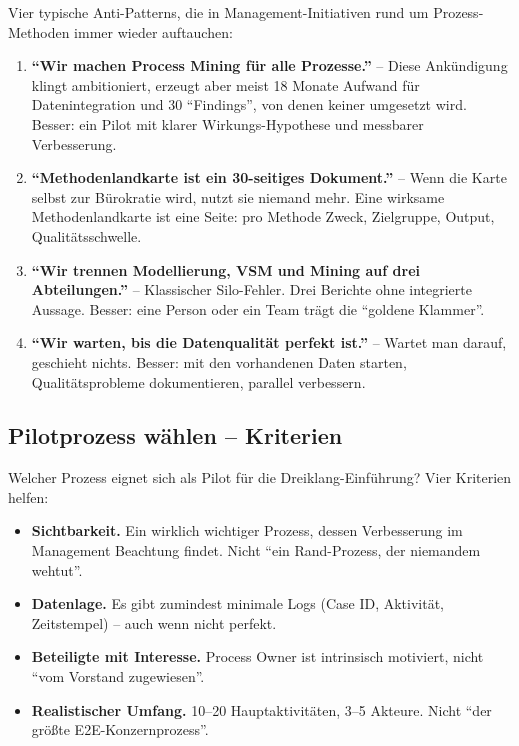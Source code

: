 \documentclass[11pt,a4paper,oneside]{article}
\newcommand{\fachbegriff}[1]{\textbf{#1}}
\begin{document}
Vier typische Anti-Patterns, die in Management-Initiativen rund um Prozess-Methoden immer wieder auftauchen:

\begin{enumerate}
  \item \fachbegriff{``Wir machen Process Mining für alle Prozesse.''} -- Diese Ankündigung klingt ambitioniert, erzeugt aber meist 18 Monate Aufwand für Datenintegration und 30 ``Findings'', von denen keiner umgesetzt wird. Besser: ein Pilot mit klarer Wirkungs-Hypothese und messbarer Verbesserung.
  \item \fachbegriff{``Methodenlandkarte ist ein 30-seitiges Dokument.''} -- Wenn die Karte selbst zur Bürokratie wird, nutzt sie niemand mehr. Eine wirksame Methodenlandkarte ist eine Seite: pro Methode Zweck, Zielgruppe, Output, Qualitätsschwelle.
  \item \fachbegriff{``Wir trennen Modellierung, VSM und Mining auf drei Abteilungen.''} -- Klassischer Silo-Fehler. Drei Berichte ohne integrierte Aussage. Besser: eine Person oder ein Team trägt die ``goldene Klammer''.
  \item \fachbegriff{``Wir warten, bis die Datenqualität perfekt ist.''} -- Wartet man darauf, geschieht nichts. Besser: mit den vorhandenen Daten starten, Qualitätsprobleme dokumentieren, parallel verbessern.
\end{enumerate}

\subsection{Pilotprozess wählen -- Kriterien}

Welcher Prozess eignet sich als Pilot für die Dreiklang-Einführung? Vier Kriterien helfen:

\begin{itemize}
  \item \textbf{Sichtbarkeit.} Ein wirklich wichtiger Prozess, dessen Verbesserung im Management Beachtung findet. Nicht ``ein Rand-Prozess, der niemandem wehtut''.
  \item \textbf{Datenlage.} Es gibt zumindest minimale Logs (Case ID, Aktivität, Zeitstempel) -- auch wenn nicht perfekt.
  \item \textbf{Beteiligte mit Interesse.} Process Owner ist intrinsisch motiviert, nicht ``vom Vorstand zugewiesen''.
  \item \textbf{Realistischer Umfang.} 10--20 Hauptaktivitäten, 3--5 Akteure. Nicht ``der größte E2E-Konzernprozess''.
\end{itemize}
\end{document}
